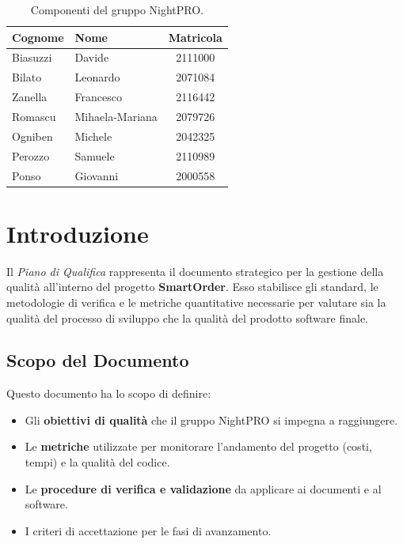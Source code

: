 \documentclass[a4paper,11pt,oneside]{scrartcl}
\begin{document}
\begin{table}[h!]
    \centering
    \renewcommand{\arraystretch}{1.2}
    \begin{tabular}{@{}llc@{}}
        \toprule
        \textbf{Cognome} & \textbf{Nome}   & \textbf{Matricola} \\
        \midrule
        Biasuzzi         & Davide          & 2111000            \\
        Bilato           & Leonardo        & 2071084            \\
        Zanella          & Francesco       & 2116442            \\
        Romascu          & Mihaela-Mariana & 2079726            \\
        Ogniben          & Michele         & 2042325            \\
        Perozzo          & Samuele         & 2110989            \\
        Ponso            & Giovanni        & 2000558            \\
        \bottomrule
    \end{tabular}
    \caption{Componenti del gruppo NightPRO.}
\end{table}

\newpage
\section{Introduzione}

Il \textit{Piano di Qualifica} rappresenta il documento strategico per la gestione della qualità all'interno del progetto \textbf{SmartOrder}. Esso stabilisce gli standard, le metodologie di verifica e le metriche quantitative necessarie per valutare sia la qualità del processo di sviluppo che la qualità del prodotto software finale.

\subsection{Scopo del Documento}
Questo documento ha lo scopo di definire:
\begin{itemize}
    \item Gli \textbf{obiettivi di qualità} che il gruppo NightPRO si impegna a raggiungere.
    \item Le \textbf{metriche} utilizzate per monitorare l'andamento del progetto (costi, tempi) e la qualità del codice.
    \item Le \textbf{procedure di verifica e validazione} da applicare ai documenti e al software.
    \item I criteri di accettazione per le fasi di avanzamento.
\end{itemize}
\end{document}
